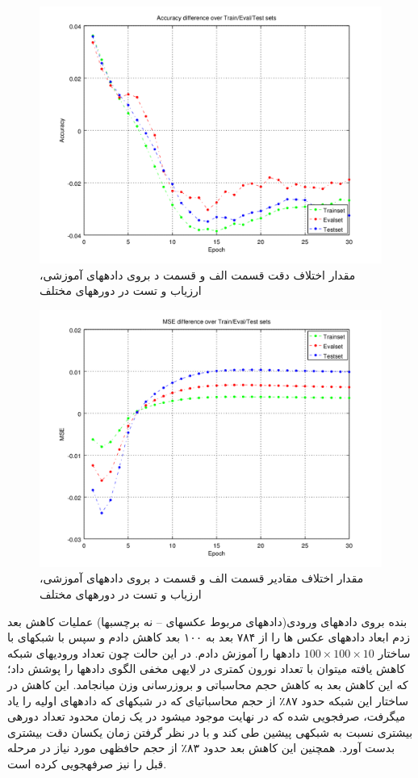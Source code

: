 \documentclass[10pt,a4paper]{article}
\newcommand{\نیمفاصله}{\halfspace}
\renewcommand{\ }{\halfspace}
\newcommand{\بپ}{انتشار-به-عقب }
\newcommand{\منست}{\lr{MNIST} }
\newcommand{\مسی}{\lr{MSE} }
\newcommand{\فوتنت}[1]{\footnote{\lr{#1}}}
\begin{document}
\begin{figure}
\centering
\includegraphics[width=.9\textwidth]{4_reg_diff_acc}
\caption{مقدار اختلاف دقت قسمت الف و قسمت د بروی داده\ های آموزشی، ارزیاب و تست در دوره\ های مختلف}\label{fig:section_d_reg_diff_acc}
\end{figure}
\begin{figure}
\centering
\includegraphics[width=.9\textwidth]{4_reg_diff_mse}
\caption{مقدار اختلاف مقادیر \مسی قسمت الف و قسمت د بروی داده\ های آموزشی، ارزیاب و تست در دوره\ های مختلف}\label{fig:section_d_reg_diff_mse}
\end{figure}
بنده بروی داده\ های ورودی(داده\ های مربوط عکس\ های -- نه برچسب\ ها) عملیات کاهش بعد  زدم ابعاد داده\ های عکس ها را از ۷۸۴ بعد به ۱۰۰ بعد کاهش دادم و سپس با شبکه\ ای با ساختار
$100 \times 100 \times 10$
داده\ ها را آموزش دادم. در این حالت چون تعداد ورودی\ های شبکه کاهش یافته می\ توان با تعداد نورون کمتری در لایه\ ی مخفی الگوی داده\ ها را پوشش داد؛ که این کاهش بعد به کاهش حجم محاسباتی و بروزرسانی وزن می\ انجامد. این کاهش در ساختار این شبکه حدود ۸۷٪‌ از حجم محاسباتی\ ای که در شبکه\ ای که داده\ های اولیه را یاد می\ گرفت، صرف\ جویی شده که در نهایت موجود می\ شود در یک زمان محدود تعداد دوره\ ی بیشتری نسبت به شبکه\ ی پیشین طی کند و با در نظر گرفتن زمان یکسان دقت بیشتری بدست آورد. همچنین این کاهش بعد حدود ۸۳٪ از حجم حافظه\ ی مورد نیاز در مرحله قبل را نیز صرفه\ جویی کرده است.
\end{document}
